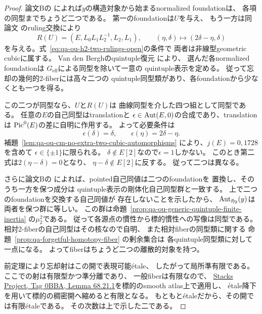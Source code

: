 \begin{proof}
論文Bの
\cite[\texttt{cor:two-intrinsic-foundations}]{QuadricModuli2026}
によれば$y$の構造対象から始まるnormalized foundationは、
各項の同型までちょうど二つである。
第一のfoundationは$U$を与え、
もう一方は同論文
\cite[\texttt{lem:elliptic-two-reflections}]{QuadricModuli2026}
のruling交換により
\[
 R(U)=(E,L_0L_1L_2^{-1},L_2,L_1),\qquad
 (\eta,\delta)\longmapsto(2\delta-\eta,\delta)
\]
を与える。式~\eqref{eq:qa-ou-h2-two-rulings-open}の条件で
両者は非線型geometric cubicに属する。
Van den Berghのquintuple復元
\cite[Theorem 5.5.10]{VdB2011}により、
選んだ各normalized foundationは
$G_{\mathrm{eff}}$による同型を除いて一意の
quintuple表示を定める。
従って忘却の幾何的2-fiberには高々二つの
quintuple同型類があり、各foundationから少なくとも一つを得る。

この二つが同型なら、$U$と$R(U)$は
曲線同型を介した四つ組として同型である。
任意の$E$の自己同型はtranslationと
$\epsilon\in\operatorname{Aut}(E,0)$の合成であり、translationは
$\operatorname{Pic}^0(E)$の差に自明に作用する。
よって必要条件は
\[
 \epsilon(\delta)=\delta,\qquad
 \epsilon(\eta)=2\delta-\eta.
\]
補題~\ref{lem:qa-ou-cm-no-extra-two-cubic-automorphisms}
により、$j(E)=0,1728$を含めて
$\epsilon\in\{\pm1\}$に限られる。
$\delta\notin E[2]$なので$\epsilon=1$しかない。
このとき第二式は$2(\eta-\delta)=0$となり、
$\eta-\delta\notin E[2]$に反する。
従って二つは異なる。

さらに論文Bの
\cite[\texttt{cor:h2-point-groupoid-foundation}]{QuadricModuli2026}
によれば、pointed自己同値は二つのfoundationを
置換し、そのうち一方を保つ成分は
quintuple表示の剛体化自己同型群と一致する。
上で二つのfoundationを交換する自己同値が
存在しないことを示したから、
$\operatorname{Aut}_{\mathfrak H_2}(y)$は
両者を保つ群に等しい。
この群は命題~\ref{prop:qa-ou-generic-quintuple-finite-inertia}
の$\mu_2^2$である。
従って各源点の慣性から標的慣性への写像は同型である。
相対2-fiberの自己同型はその核なので自明、
また相対fiberの同型類に関する
命題~\ref{prop:qa-forgetful-homotopy-fiber} の剰余集合は
各quintuple同型類に対して一点になる。
よってfiberはちょうど二つの離散的対象を持つ。

前定理により忘却射はこの開で表現可能étale、
したがって局所準有限である。
ここでの射は有限型かつ準分離であり、
一般fiberは有限なので、
\href{https://stacks.math.columbia.edu/tag/0BBA}{Stacks Project, Tag 0BBA,
Lemma 68.21.1}を標的のsmooth atlas上で適用し、
étale降下を用いて標的の稠密開へ縮めると有限となる。
もともとétaleだから、その開では有限étaleである。
その次数は上で示した二である。
\end{proof}


